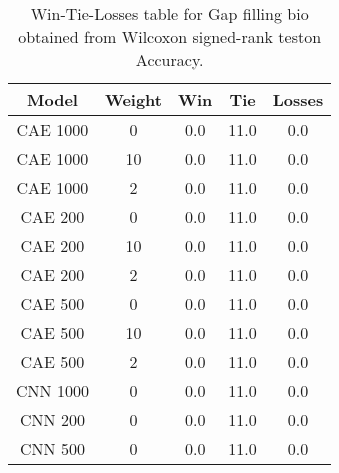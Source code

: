 \begin{table}[H]
\centering
\begin{tabular}{|c|c|c|c|c|}

\textbf{Model} & \textbf{Weight} &  \textbf{Win} &  \textbf{Tie} &  \textbf{Losses} \\
\hline

      CAE 1000 &               0 &           0.0 &          11.0 &              0.0 \\
\hline
      CAE 1000 &              10 &           0.0 &          11.0 &              0.0 \\
\hline
      CAE 1000 &               2 &           0.0 &          11.0 &              0.0 \\
\hline
       CAE 200 &               0 &           0.0 &          11.0 &              0.0 \\
\hline
       CAE 200 &              10 &           0.0 &          11.0 &              0.0 \\
\hline
       CAE 200 &               2 &           0.0 &          11.0 &              0.0 \\
\hline
       CAE 500 &               0 &           0.0 &          11.0 &              0.0 \\
\hline
       CAE 500 &              10 &           0.0 &          11.0 &              0.0 \\
\hline
       CAE 500 &               2 &           0.0 &          11.0 &              0.0 \\
\hline
      CNN 1000 &               0 &           0.0 &          11.0 &              0.0 \\
\hline
       CNN 200 &               0 &           0.0 &          11.0 &              0.0 \\
\hline
       CNN 500 &               0 &           0.0 &          11.0 &              0.0 \\
\hline

\end{tabular}
\caption{Win-Tie-Losses table for Gap filling bio obtained from Wilcoxon signed-rank teston Accuracy.}
\label{tab:gap_filling_bio_weighted_comparison_all}
\end{table}